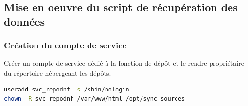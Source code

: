 \subsection{Mise en oeuvre du script de récupération des données}
\subsubsection{Création du compte de service}

Créer un compte de service dédié à la fonction de dépôt et le rendre propriétaire du répertoire hébergeant les dépôts.
\begin{lstlisting}[language=bash, caption=Compte de service]
useradd svc_repodnf -s /sbin/nologin
chown -R svc_repodnf /var/www/html /opt/sync_sources
\end{lstlisting}


